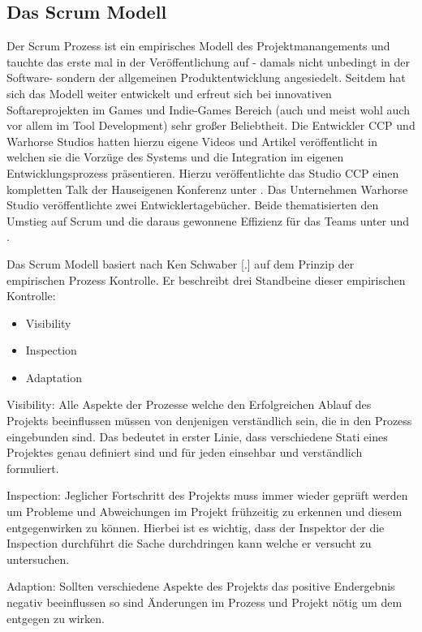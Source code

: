 \documentclass[pagesize, paper=a4, fontsize=12pt, titlepage=true, headings=small, headnosepline, abstractoff, liststotoc, nochapterprefix, plainheadsepline, twoside]{scrreprt}
\begin{document}
\subsection{Das Scrum Modell}
Der Scrum Prozess ist ein empirisches Modell des Projektmanangements und tauchte das erste mal in der Veröffentlichung  auf - damals nicht unbedingt in der Software- sondern der allgemeinen Produktentwicklung angesiedelt. Seitdem hat sich das Modell weiter entwickelt und erfreut sich bei innovativen Softareprojekten im Games und Indie-Games Bereich (auch und meist wohl auch vor allem im Tool Development) sehr großer Beliebtheit. Die Entwickler CCP und Warhorse Studios hatten hierzu eigene Videos und Artikel veröffentlicht in welchen sie die Vorzüge des Systems und die Integration im eigenen Entwicklungsprozess präsentieren. Hierzu veröffentlichte das Studio CCP einen kompletten Talk der Hauseigenen Konferenz unter .  Das Unternehmen Warhorse Studio veröffentlichte zwei Entwicklertagebücher. Beide thematisierten den Umstieg auf Scrum und die daraus gewonnene Effizienz für das Teams unter  und .

Das Scrum Modell basiert nach Ken Schwaber [.] auf dem Prinzip der empirischen Prozess Kontrolle. Er beschreibt drei Standbeine dieser empirischen Kontrolle:
\begin{itemize}
\item Visibility
\item Inspection
\item Adaptation
\end{itemize}

Visibility: Alle Aspekte der Prozesse welche den Erfolgreichen Ablauf des Projekts beeinflussen müssen von denjenigen verständlich sein, die in den Prozess eingebunden sind. Das bedeutet in erster Linie, dass verschiedene Stati eines Projektes genau definiert sind und für jeden einsehbar und verständlich formuliert. 

Inspection: Jeglicher Fortschritt des Projekts muss immer wieder geprüft werden um Probleme und Abweichungen im Projekt frühzeitig zu erkennen und diesem entgegenwirken zu können. Hierbei ist es wichtig, dass der Inspektor der die Inspection durchführt die Sache durchdringen kann welche er versucht zu untersuchen.

Adaption: Sollten verschiedene Aspekte des Projekts das positive Endergebnis negativ beeinflussen so sind Änderungen im Prozess und Projekt nötig um dem entgegen zu wirken.
\end{document}
